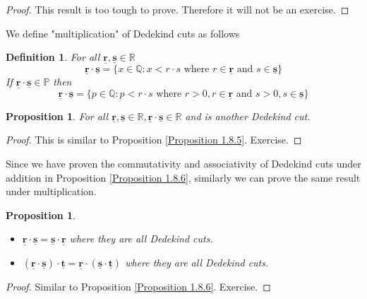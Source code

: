 \documentclass{book}
\newtheorem{definition}[theorem]{Definition}
\newtheorem{proposition}[theorem]{Proposition}
\begin{document}
\begin{proof}
    This result is too tough to prove. Therefore it will not be an exercise.
\end{proof}

We define "multiplication" of Dedekind cuts as follows

\begin{definition}
    For all $\underline{\mathbf{r}}, \underline{\mathbf{s}} \in \mathbb{R}$
    $$\underline{\mathbf{r}} \cdot \underline{\mathbf{s}} = \{ x \in \mathbb{Q} : x < r \cdot s \text{ where }  r \in \underline{\mathbf{r}} \text{ and } s \in \underline{\mathbf{s}} \}$$
    If $\underline{\mathbf{r}} \cdot \underline{\mathbf{s}} \in \mathbb{P}$ then
    $$\underline{\mathbf{r}} \cdot \underline{\mathbf{s}} = \{ p \in \mathbb{Q} : p < r \cdot s \text{ where }  r > 0, r \in \underline{\mathbf{r}} \text{ and } s > 0, s \in \underline{\mathbf{s}} \}$$
\end{definition}

\begin{proposition}
    For all $\underline{\mathbf{r}}, \underline{\mathbf{s}} \in \mathbb{R}, \underline{\mathbf{r}} \cdot \underline{\mathbf{s}} \in \mathbb{R}$ and is another Dedekind cut.
\end{proposition}

\begin{proof}
    This is similar to Proposition \ref{Proposition 1.8.5}. Exercise.
\end{proof}

Since we have proven the commutativity and associativity of Dedekind cuts under addition in Proposition \ref{Proposition 1.8.6}, similarly we can prove the same result under multiplication.

\begin{proposition}
    \begin{itemize}
        \item[(1)] $\underline{\mathbf{r}} \cdot \underline{\mathbf{s}} = \underline{\mathbf{s}} \cdot \underline{\mathbf{r}}$ where they are all Dedekind cuts.
        \item[(2)] $(\underline{\mathbf{r}} \cdot \underline{\mathbf{s}}) \cdot \underline{\mathbf{t}} = \underline{\mathbf{r}} \cdot (\underline{\mathbf{s}} \cdot \underline{\mathbf{t}})$ where they are all Dedekind cuts.
    \end{itemize}
\end{proposition}

\begin{proof}
    Similar to Proposition \ref{Proposition 1.8.6}. Exercise.
\end{proof}
\end{document}
